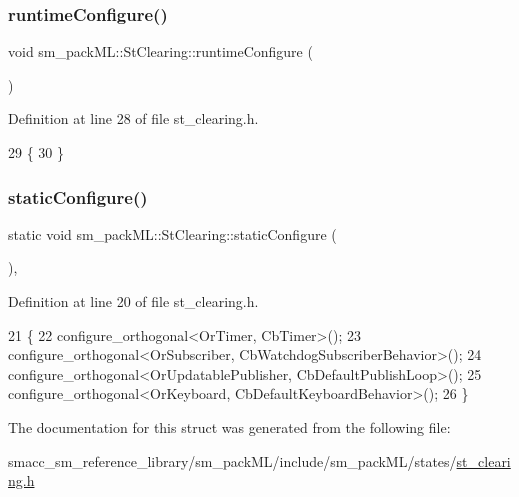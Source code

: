 \subsubsection{\texorpdfstring{runtime\+Configure()}{runtimeConfigure()}}
{\footnotesize\ttfamily void sm\+\_\+pack\+M\+L\+::\+St\+Clearing\+::runtime\+Configure (\begin{DoxyParamCaption}{ }\end{DoxyParamCaption})\hspace{0.3cm}{\ttfamily [inline]}}



Definition at line 28 of file st\+\_\+clearing.\+h.


\begin{DoxyCode}
29     \{
30     \}
\end{DoxyCode}
\mbox{\label{structsm__packML_1_1StClearing_acd7cf3e047cae7daba192b77210b5591}} 
\subsubsection{\texorpdfstring{static\+Configure()}{staticConfigure()}}
{\footnotesize\ttfamily static void sm\+\_\+pack\+M\+L\+::\+St\+Clearing\+::static\+Configure (\begin{DoxyParamCaption}{ }\end{DoxyParamCaption})\hspace{0.3cm}{\ttfamily [inline]}, {\ttfamily [static]}}



Definition at line 20 of file st\+\_\+clearing.\+h.


\begin{DoxyCode}
21     \{
22         configure\_orthogonal<OrTimer, CbTimer>();   
23         configure\_orthogonal<OrSubscriber, CbWatchdogSubscriberBehavior>();
24         configure\_orthogonal<OrUpdatablePublisher, CbDefaultPublishLoop>();
25         configure\_orthogonal<OrKeyboard, CbDefaultKeyboardBehavior>();
26     \}
\end{DoxyCode}


The documentation for this struct was generated from the following file\+:\begin{DoxyCompactItemize}
\item 
smacc\+\_\+sm\+\_\+reference\+\_\+library/sm\+\_\+pack\+M\+L/include/sm\+\_\+pack\+M\+L/states/\hyperlink{st__clearing_8h}{st\+\_\+clearing.\+h}\end{DoxyCompactItemize}
